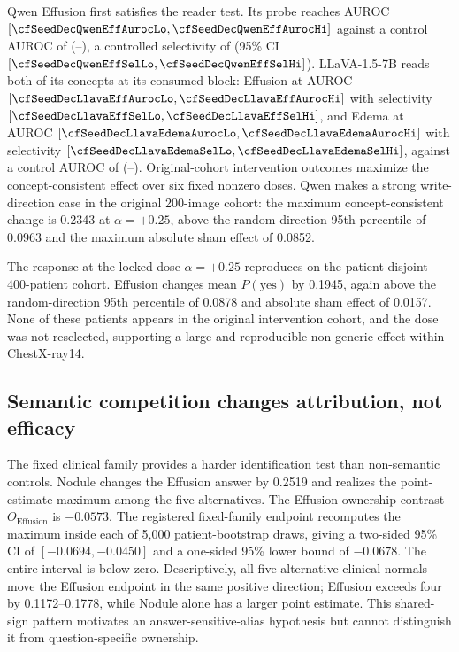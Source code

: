 \documentclass{article}
\begin{document}
Qwen Effusion first satisfies the reader test. Its probe reaches AUROC \cfSeedDecQwenEffAuroc{} $[\cfSeedDecQwenEffAurocLo,\cfSeedDecQwenEffAurocHi]$ against a control AUROC of \cfSeedDecQwenEffCtrl{} (\cfSeedDecQwenEffCtrlLo--\cfSeedDecQwenEffCtrlHi), a controlled selectivity of \cfSeedDecQwenEffSel{} (95\% CI $[\cfSeedDecQwenEffSelLo,\cfSeedDecQwenEffSelHi]$). LLaVA-1.5-7B reads both of its concepts at its consumed block: Effusion at AUROC \cfSeedDecLlavaEffAuroc{} $[\cfSeedDecLlavaEffAurocLo,\cfSeedDecLlavaEffAurocHi]$ with selectivity \cfSeedDecLlavaEffSel{} $[\cfSeedDecLlavaEffSelLo,\cfSeedDecLlavaEffSelHi]$, and Edema at AUROC \cfSeedDecLlavaEdemaAuroc{} $[\cfSeedDecLlavaEdemaAurocLo,\cfSeedDecLlavaEdemaAurocHi]$ with selectivity \cfSeedDecLlavaEdemaSel{} $[\cfSeedDecLlavaEdemaSelLo,\cfSeedDecLlavaEdemaSelHi]$, against a control AUROC of \cfSeedDecLlavaEffCtrl{} (\cfSeedDecLlavaEffCtrlLo--\cfSeedDecLlavaEffCtrlHi). Original-cohort intervention outcomes maximize the concept-consistent effect over six fixed nonzero doses. Qwen makes a strong write-direction case in the original 200-image cohort: the maximum concept-consistent change is 0.2343 at $\alpha=+0.25$, above the random-direction 95th percentile of 0.0963 and the maximum absolute sham effect of 0.0852.

The response at the locked dose $\alpha=+0.25$ reproduces on the patient-disjoint 400-patient cohort. Effusion changes mean $P(\mathrm{yes})$ by 0.1945, again above the random-direction 95th percentile of 0.0878 and absolute sham effect of 0.0157. None of these patients appears in the original intervention cohort, and the dose was not reselected, supporting a large and reproducible non-generic effect within ChestX-ray14.


\subsection{Semantic competition changes attribution, not efficacy}
\label{sec:specificity-results}

The fixed clinical family provides a harder identification test than non-semantic controls. Nodule changes the Effusion answer by 0.2519 and realizes the point-estimate maximum among the five alternatives. The Effusion ownership contrast $O_{\mathrm{Effusion}}$ is $-0.0573$. The registered fixed-family endpoint recomputes the maximum inside each of 5,000 patient-bootstrap draws, giving a two-sided 95\% CI of $[-0.0694,-0.0450]$ and a one-sided 95\% lower bound of $-0.0678$. The entire interval is below zero. Descriptively, all five alternative clinical normals move the Effusion endpoint in the same positive direction; Effusion exceeds four by 0.1172--0.1778, while Nodule alone has a larger point estimate. This shared-sign pattern motivates an answer-sensitive-alias hypothesis but cannot distinguish it from question-specific ownership.
\end{document}

